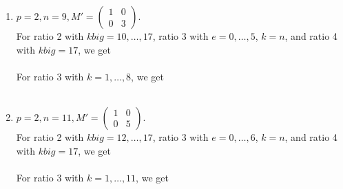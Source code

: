 \documentclass[letterpaper,12pt]{article}
\begin{document}
\begin{enumerate}
\item $p=2, n=9, M' = \begin{pmatrix}
1 & 0 \\ 0 & 3
\end{pmatrix}.$ \\
For ratio 2 with $kbig = 10, \dots, 17$, ratio 3 with $e = 0, \dots, 5$, $k=n$, and ratio 4 with $kbig = 17$, we get \\
 \\
For ratio 3 with $k = 1, \dots, 8$, we get \\
 \\

\item $p=2, n=11, M' = \begin{pmatrix}
1 & 0 \\ 0 & 5
\end{pmatrix}.$ \\
For ratio 2 with $kbig = 12, \dots, 17$, ratio 3 with $e = 0, \dots, 6$, $k=n$, and ratio 4 with $kbig = 17$, we get \\
 \\
For ratio 3 with $k = 1, \dots, 11$, we get \\
 \\


\end{enumerate}
\end{document}
